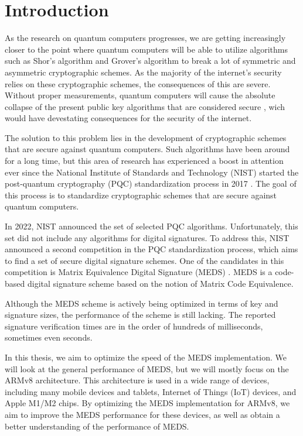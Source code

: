 \documentclass[11pt,a4paper]{report}
\theoremstyle{definition}
\begin{document}




\tableofcontents
\newpage

\chapter{Introduction}
\label{ch:introduction}
As the research on quantum computers progresses, we are getting increasingly closer to the point where quantum computers will be able to utilize algorithms such as Shor's algorithm \cite{shor1994algorithms} and Grover's algorithm \cite{grover1996fast} to break a lot of symmetric and asymmetric cryptographic schemes. As the majority of the internet's security relies on these cryptographic schemes, the consequences of this are severe. Without proper measurements, quantum computers will cause the absolute collapse of the present public key algorithms that are considered secure \cite{mavroeidis2018impact}, wich would have devestating consequences for the security of the internet.

The solution to this problem lies in the development of cryptographic schemes that are secure against quantum computers. Such algorithms have been around for a long time, but this area of research has experienced a boost in attention ever since the National Institute of Standards and Technology (NIST) started the post-quantum cryptography (PQC) standardization process in 2017 \cite{nist2017pqc}. The goal of this process is to standardize cryptographic schemes that are secure against quantum computers.

In 2022, NIST announced the set of selected PQC algorithms. Unfortunately, this set did not include any algorithms for digital signatures. To address this, NIST announced a second competition in the PQC standardization process, which aims to find a set of secure digital signature schemes. One of the candidates in this competition is Matrix Equivalence Digital Signature (MEDS) \cite{chou2023take}. MEDS is a code-based digital signature scheme based on the notion of Matrix Code Equivalence.

Although the MEDS scheme is actively being optimized in terms of key and signature sizes, the performance of the scheme is still lacking. The reported signature verification times are in the order of hundreds of milliseconds, sometimes even seconds.

In this thesis, we aim to optimize the speed of the MEDS implementation. We will look at the general performance of MEDS, but we will mostly focus on the ARMv8 architecture. This architecture is used in a wide range of devices, including many mobile devices and tablets, Internet of Things (IoT) devices, and Apple M1/M2 chips. By optimizing the MEDS implementation for ARMv8, we aim to improve the MEDS performance for these devices, as well as obtain a better understanding of the performance of MEDS.
\end{document}

